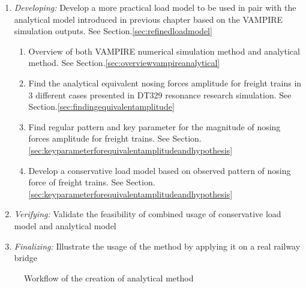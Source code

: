 \begin{enumerate}
    \item \textit{Developing:} Develop a more practical load model to be used in pair with the analytical model introduced in previous chapter based on the VAMPIRE simulation outputs. See Section.\ref{sec:refinedloadmodel}
        \begin{enumerate}[label*=\arabic*.]
            \item Overview of both VAMPIRE numerical simulation method and analytical method. See Section.\ref{sec:overviewvampireanalytical}
            \item Find the analytical equivalent nosing forces amplitude for freight trains in 3 different cases presented in DT329 resonance research simulation. See Section.\ref{sec:findingequivalentamplitude}
            \item Find regular pattern and key parameter for the magnitude of nosing forces amplitude for freight trains. See Section.\ref{sec:keyparameterforequivalentamplitudeandhypothesis}
            \item Develop a conservative load model based on observed pattern of nosing force of freight trains. See Section.\ref{sec:keyparameterforequivalentamplitudeandhypothesis}
        \end{enumerate} 
    \item \textit{Verifying:} Validate the feasibility of combined usage of conservative load model and analytical model
    \item \textit{Finalizing:} Illustrate the usage of the method by applying it on a real railway bridge
\end{enumerate}

\begin{figure}[h!]
\centering
{}
\caption{Workflow of the creation of analytical method}
\label{fig:workflowanalyticalmethod}
\end{figure}

